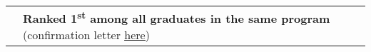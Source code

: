 \documentclass[10pt, oneside]{article}
\def \b {\textbf}
\begin{document}
\begin{tabularx}{\linewidth}{p{2.2cm}|p{17cm}}
&\b{Ranked {1\textsuperscript{st}} among all graduates in the same program} (confirmation letter \href{https://drive.google.com/open?id=1ZCn4DEuqxciS6mTMCwEY44IbwPbFbu3G}{\underline{here}})
\\
\end{tabularx}
\end{document}

